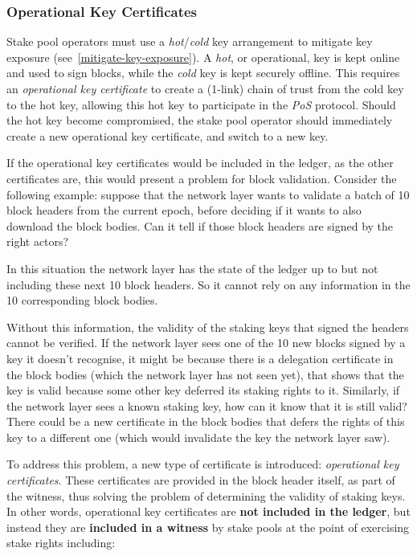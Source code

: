 \documentclass[11pt,a4paper]{article}
\begin{document}
\subsubsection{Operational Key Certificates}
\label{operational-key-certificates}

Stake pool operators must use a \emph{hot}/\emph{cold} key
arrangement to mitigate key exposure
(see~\cref{mitigate-key-exposure}). A \emph{hot}, or operational, key
is kept online and used to sign blocks, while the \emph{cold} key is
kept securely offline. This requires an \emph{operational key
  certificate} to create a (1-link) chain of trust from the cold key
to the hot key, allowing this hot key to participate in the \emph{PoS}
protocol. Should the hot key become compromised, the stake pool
operator should immediately create a new operational key certificate, and
switch to a new key.

If the operational key certificates would be included in the ledger,
as the other certificates are, this would present a problem for block
validation. Consider the following example: suppose that the network
layer wants to validate a batch of 10 block headers from the current
epoch, before deciding if it wants to also download the block
bodies. Can it tell if those block headers are signed by the right
actors?

In this situation the network layer has the state of the ledger up to
but not including these next 10 block headers. So it cannot rely on
any information in the 10 corresponding block bodies.

Without this information, the validity of the staking keys that signed
the headers cannot be verified. If the network layer sees one of the
10 new blocks signed by a key it doesn't recognise, it might be
because there is a delegation certificate in the block bodies (which
the network layer has not seen yet), that shows that the key is valid
because some other key deferred its staking rights to it. Similarly,
if the network layer sees a known staking key, how can it know that it
is still valid? There could be a new certificate in the block bodies
that defers the rights of this key to a different one (which would
invalidate the key the network layer saw).

To address this problem, a new type of certificate is introduced:
\emph{operational key certificates}. These certificates are provided
in the block header itself, as part of the witness, thus solving the
problem of determining the validity of staking keys. In other words,
operational key certificates are \textbf{not included in
  the ledger}, but instead they are \textbf{included in a witness} by
stake pools at the point of exercising stake rights including:
\end{document}
